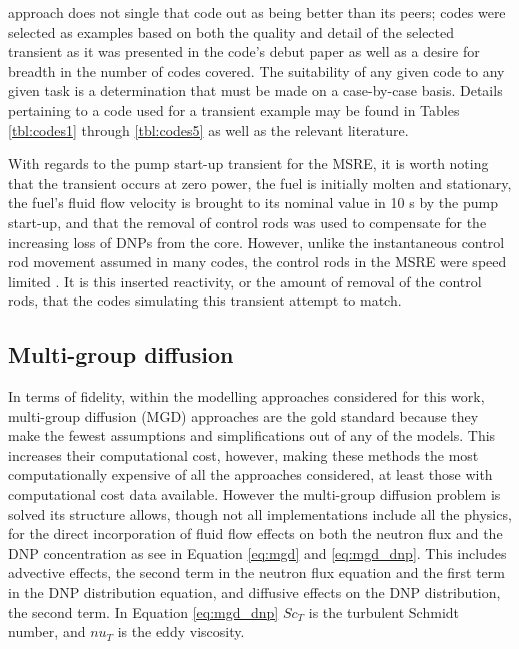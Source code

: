 \documentclass[review]{elsarticle}
\begin{document}
approach does not single that code out as being better than its peers; codes
were selected as examples based on both the quality and detail of the selected
transient as it was presented in the code's debut paper as well as
a desire for breadth in the number of codes covered.
 The suitability of any given code to any given task
is a determination that must be made on a case-by-case basis. Details pertaining
to a code used for a transient example may be found in Tables \ref{tbl:codes1}
through \ref{tbl:codes5} as
well as the relevant literature.
\par With regards to the pump start-up transient for the MSRE, it is worth noting
that the transient occurs at zero power, the fuel is initially molten and
stationary, the fuel's fluid flow velocity is brought to its nominal value in
10 s by the pump start-up, and that the removal of control rods was used to
compensate for the increasing loss of DNPs from the core. However, 
unlike the instantaneous control rod movement assumed in many codes, 
the control rods in the
MSRE were speed limited \cite{krepel_dyn3d-msr_2007}. It is this inserted
reactivity, or the amount of removal of the control rods, that the codes simulating
this transient attempt to match.

\subsection{Multi-group diffusion} \label{ssec:mgd}
In terms of fidelity, within the modelling approaches considered for this
work, multi-group diffusion (MGD) approaches are the gold standard because they
make the fewest assumptions and simplifications out of any of the models.
This increases their computational cost, however, making these methods
the most computationally expensive of all the approaches considered, at least
those with computational cost data available. However the multi-group
diffusion problem is solved its structure allows, though not all implementations
include all the physics, for the direct incorporation
of fluid flow effects on both the neutron flux and the DNP concentration as
see in Equation \ref{eq:mgd} and \ref{eq:mgd_dnp}.
This includes advective effects, the second term in the neutron flux equation 
 and the first term in the DNP distribution equation, and diffusive effects on
 the DNP distribution, the second term. In Equation \ref{eq:mgd_dnp}
 $Sc_{T}$ is the turbulent Schmidt number, and $nu_{T}$ is the eddy viscosity. 
\end{document}
